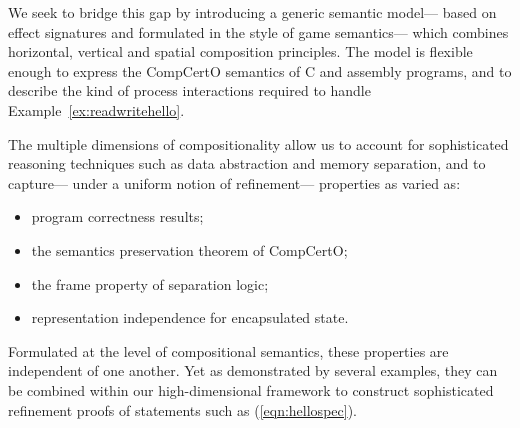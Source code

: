 \documentclass[acmsmall,screen,review,nonacm]{acmart}
\begin{document}
We seek to bridge this gap
by introducing a generic semantic model---%
based on effect signatures and formulated in the style of game semantics---%
which combines horizontal, vertical and spatial composition principles.
The model is flexible enough
to express the CompCertO semantics of C and assembly programs,
and to describe the kind of process interactions %
required to handle Example~\ref{ex:readwritehello}.

The multiple dimensions of compositionality
allow us to account for sophisticated reasoning techniques
such as data abstraction and memory separation,
and to capture---%
under a uniform notion of refinement---%
properties as varied as:
\begin{itemize}
  \item program correctness results;
  \item the semantics preservation theorem of CompCertO;
  \item the frame property of separation logic;
  \item representation independence for encapsulated state.
\end{itemize}
Formulated at the level of compositional semantics,
these properties are independent of one another.
Yet as demonstrated by several examples,
they can be combined within our high-dimensional framework
to construct sophisticated refinement proofs
of statements such as (\ref{eqn:hellospec}).
\end{document}
